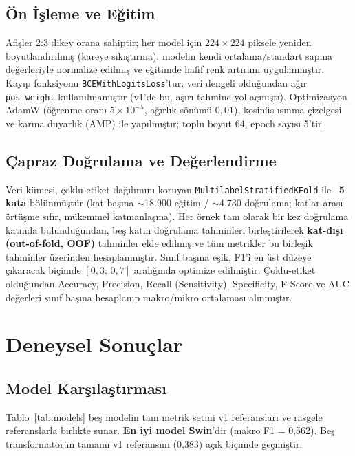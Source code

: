 \documentclass[conference]{IEEEtran}
\begin{document}
\subsection{Ön İşleme ve Eğitim}
Afişler 2:3 dikey orana sahiptir; her model için $224\times224$ piksele yeniden
boyutlandırılmış (kareye sıkıştırma), modelin kendi ortalama/standart sapma
değerleriyle normalize edilmiş ve eğitimde hafif renk artırımı uygulanmıştır.
Kayıp fonksiyonu \texttt{BCEWithLogitsLoss}'tur; veri dengeli olduğundan ağır
\texttt{pos\_weight} kullanılmamıştır (v1'de bu, aşırı tahmine yol açmıştı).
Optimizasyon AdamW (öğrenme oranı $5\times10^{-5}$, ağırlık sönümü $0{,}01$),
kosinüs ısınma çizelgesi ve karma duyarlık (AMP) ile yapılmıştır; toplu boyut 64,
epoch sayısı 5'tir.

\subsection{Çapraz Doğrulama ve Değerlendirme}
Veri kümesi, çoklu-etiket dağılımını koruyan \texttt{MultilabelStratifiedKFold}
ile~\cite{stratif} \textbf{5 kata} bölünmüştür (kat başına $\sim$18.900 eğitim /
$\sim$4.730 doğrulama; katlar arası örtüşme sıfır, mükemmel katmanlaşma). Her
örnek tam olarak bir kez doğrulama katında bulunduğundan, beş katın doğrulama
tahminleri birleştirilerek \textbf{kat-dışı (out-of-fold, OOF)} tahminler elde
edilmiş ve tüm metrikler bu birleşik tahminler üzerinden hesaplanmıştır. Sınıf
başına eşik, F1'i en üst düzeye çıkaracak biçimde $[0{,}3;\,0{,}7]$ aralığında
optimize edilmiştir. Çoklu-etiket olduğundan Accuracy, Precision,
Recall (Sensitivity), Specificity, F-Score ve AUC değerleri sınıf başına
hesaplanıp makro/mikro ortalaması alınmıştır.

\section{Deneysel Sonuçlar}
\subsection{Model Karşılaştırması}
Tablo~\ref{tab:models} beş modelin tam metrik setini v1 referansları ve rasgele
referanslarla birlikte sunar. \textbf{En iyi model Swin}'dir (makro F1 = 0,562).
Beş transformatörün tamamı v1 referansını (0,383) açık biçimde geçmiştir.
\end{document}
